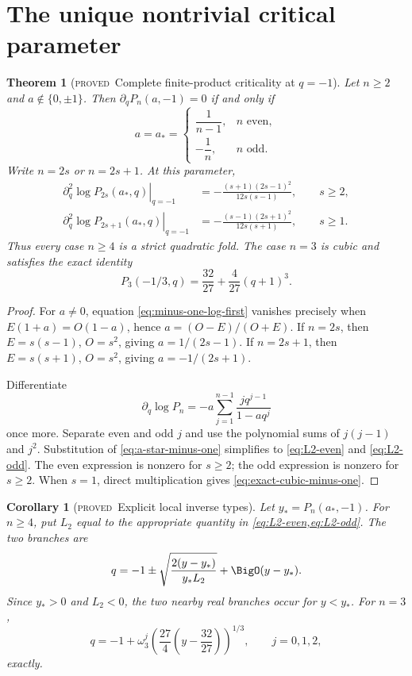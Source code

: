 \documentclass[11pt,letterpaper,oneside,openany]{book}
\newtheorem{theorem}{Theorem}[chapter]
\newtheorem{corollary}{Corollary}[chapter]
\theoremstyle{definition}
\theoremstyle{remark}
\newcommand{\statusproved}{\textcolor{provedgreen}{\textsc{proved}}}
\begin{document}
\section{The unique nontrivial critical parameter}
\begin{theorem}[\statusproved\ Complete finite-product criticality at
\(q=-1\)]
Let \(n\ge2\) and \(a\notin\{0,\pm1\}\).  Then
\(\partial_qP_n(a,-1)=0\) if and only if
\begin{equation}
 a=a_*=
 \begin{cases}
 \dfrac1{n-1},&n\text{ even},\\[0.45em]
 -\dfrac1n,&n\text{ odd}.
 \end{cases}
 \label{eq:a-star-minus-one}
\end{equation}
Write \(n=2s\) or \(n=2s+1\).  At this parameter,
\begin{align}
 \left.\partial_q^2\log P_{2s}(a_*,q)\right|_{q=-1}
 &=-\frac{(s+1)(2s-1)^2}{12s(s-1)}, \qquad s\ge2,
 \label{eq:L2-even} \\
 \left.\partial_q^2\log P_{2s+1}(a_*,q)\right|_{q=-1}
 &=-\frac{(s-1)(2s+1)^2}{12s(s+1)}, \qquad s\ge1.
 \label{eq:L2-odd}
\end{align}
Thus every case \(n\ge4\) is a strict quadratic fold.  The case \(n=3\) is
cubic and satisfies the exact identity
\begin{equation}
 P_3(-1/3,q)=\frac{32}{27}+\frac4{27}(q+1)^3.
 \label{eq:exact-cubic-minus-one}
\end{equation}
\end{theorem}
\begin{proof}
For \(a\ne0\), equation \cref{eq:minus-one-log-first} vanishes precisely when
\(E(1+a)=O(1-a)\), hence \(a=(O-E)/(O+E)\).  If \(n=2s\), then
\(E=s(s-1)\), \(O=s^2\), giving \(a=1/(2s-1)\).  If \(n=2s+1\), then
\(E=s(s+1)\), \(O=s^2\), giving \(a=-1/(2s+1)\).

Differentiate
\[
 \partial_q\log P_n=-a\sum_{j=1}^{n-1}
 \frac{jq^{j-1}}{1-aq^j}
\]
once more.  Separate even and odd \(j\) and use the polynomial sums of
\(j(j-1)\) and \(j^2\).  Substitution of \cref{eq:a-star-minus-one} simplifies
to \cref{eq:L2-even} and \cref{eq:L2-odd}.  The even expression is nonzero for
\(s\ge2\); the odd expression is nonzero for \(s\ge2\).  When \(s=1\), direct
multiplication gives \cref{eq:exact-cubic-minus-one}.
\end{proof}

\begin{corollary}[\statusproved\ Explicit local inverse types]
Let \(y_*=P_n(a_*,-1)\).  For \(n\ge4\), put \(L_2\) equal to the appropriate
quantity in \cref{eq:L2-even,eq:L2-odd}.  The two branches are
\begin{equation}
 q=-1\pm\sqrt{\frac{2(y-y_*)}{y_*L_2}}+\BigO(y-y_*).
 \label{eq:minus-one-fold-inverse}
\end{equation}
Since \(y_*>0\) and \(L_2<0\), the two nearby real branches occur for
\(y<y_*\).  For \(n=3\),
\begin{equation}
 q=-1+\omega_3^j\left(\frac{27}{4}
 \left(y-\frac{32}{27}\right)\right)^{1/3},
 \qquad j=0,1,2,
 \label{eq:minus-one-cubic-inverse}
\end{equation}
exactly.
\end{corollary}
\end{document}
